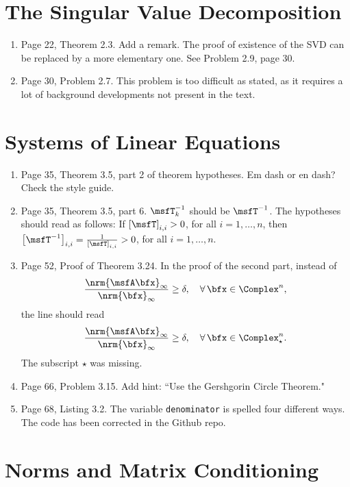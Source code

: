\documentclass{book}
\begin{document}
	\chapter{The Singular Value Decomposition}
	
	\begin{enumerate}
	\item
Page 22, Theorem 2.3. Add a remark. The proof of existence of the SVD can be replaced by a more elementary one. See Problem 2.9, page 30.

	\item
Page 30, Problem 2.7. This problem is too difficult as stated, as it requires a lot of background developments not present in the text.
	\end{enumerate}
	
	\chapter{Systems of Linear Equations}
	
	\begin{enumerate}
	\item 
Page 35, Theorem 3.5, part 2 of theorem hypotheses. Em dash or en dash? Check the style guide.
	\item 
Page 35, Theorem 3.5, part 6. $\msfT_k^{-1}$ should be $\msfT^{-1}$. The hypotheses should read as follows: If $\left[ \msfT \right]_{i,i} >0$, for all $i =1, \ldots , n$, then  $\left[ \msfT^{-1} \right]_{i,i} = \frac{1}{\left[ \msfT \right]_{i,i}} > 0$, for all $i =1, \ldots , n$.

	\item
Page 52, Proof of Theorem 3.24. In the proof of the second part, instead of 
	\[
\frac{\nrm{\msfA\bfx}_\infty}{\nrm{\bfx}_\infty} \ge \delta, \quad \forall \, \bfx \in \Complex^n,
	\]
the line should read
	\[
\frac{\nrm{\msfA\bfx}_\infty}{\nrm{\bfx}_\infty} \ge \delta, \quad \forall \, \bfx \in \Complex_\star^n.	
	\]
The subscript $\star$ was missing.

	\item
Page 66, Problem 3.15. Add hint: ``Use the Gershgorin Circle Theorem."

	\item
Page 68, Listing 3.2. The variable {\tt denominator} is spelled four different ways. The code has been corrected in the Github repo.
	\end{enumerate}
	
	\chapter{Norms and Matrix Conditioning}
	
\end{document}
